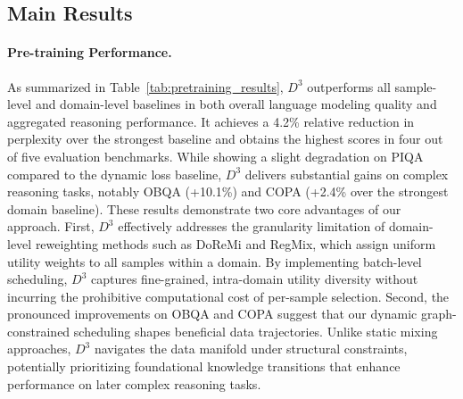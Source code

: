 \subsection{Main Results}

\paragraph{Pre-training Performance.} 
As summarized in Table~\ref{tab:pretraining_results}, $D^3$ outperforms all sample-level and domain-level baselines in both overall language modeling quality and aggregated reasoning performance. It achieves a 4.2\% relative reduction in perplexity over the strongest baseline and obtains the highest scores in four out of five evaluation benchmarks. While showing a slight degradation on PIQA compared to the dynamic loss baseline, $D^3$ delivers substantial gains on complex reasoning tasks, notably OBQA (+10.1\%) and COPA (+2.4\% over the strongest domain baseline). These results demonstrate two core advantages of our approach. First, $D^3$ effectively addresses the granularity limitation of domain-level reweighting methods such as DoReMi and RegMix, which assign uniform utility weights to all samples within a domain. By implementing batch-level scheduling, $D^3$ captures fine-grained, intra-domain utility diversity without incurring the prohibitive computational cost of per-sample selection. Second, the pronounced improvements on OBQA and COPA suggest that our dynamic graph-constrained scheduling shapes beneficial data trajectories. Unlike static mixing approaches, $D^3$ navigates the data manifold under structural constraints, potentially prioritizing foundational knowledge transitions that enhance performance on later complex reasoning tasks.

